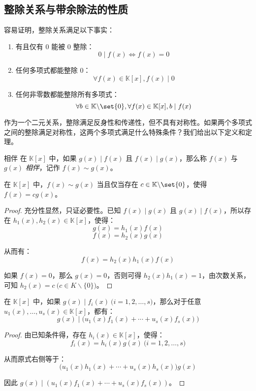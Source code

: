 \subsection{整除关系与带余除法的性质}

容易证明，整除关系满足以下事实：
\begin{enumerate}
	\item 有且仅有 $0$ 能被 $0$ 整除：
	$$
	0 \mid f(x) \Longleftrightarrow f(x) = 0
	$$

	\item 任何多项式都能整除 $0$：
	$$
	\forall f(x) \in \mathbb K[x], f(x) \mid 0
	$$
	\item 任何非零数都能整除所有多项式：
	$$
	\forall b \in \mathbb K \backslash \set{0}, \forall f(x) \in \mathbb K[x], b \mid f(x)
	$$
\end{enumerate}

作为一个二元关系，整除满足反身性和传递性，但不具有对称性。如果两个多项式之间的整除满足对称性，这两个多项式满足什么特殊条件？我们给出以下定义和定理。

\begin{definition}{相伴}
	在 $\mathbb K[x]$ 中，如果 $g(x) \mid f(x)$ 且 $f(x) \mid g(x)$，那么称 $f(x)$ 与 $g(x)$ \emph{相伴}，记作 $f(x) \sim g(x)$。
\end{definition}

\begin{proposition}
	在 $\mathbb K[x]$ 中，$f(x) \sim g(x)$ 当且仅当存在 $c \in \mathbb K \backslash \set{0}$，使得 $f(x) = c g(x)$。
\end{proposition}

\begin{proof}
	充分性显然，只证必要性。已知 $f(x) \mid g(x)$ 且 $g(x) \mid f(x)$，所以存在 $h_1(x), h_2(x) \in \mathbb K[x]$，使得：
	$$
	g(x) = h_1(x) f(x)
	$$$$
	f(x) = h_2(x) g(x)
	$$

	从而有：
	$$
	f(x) = h_2(x) h_1(x) f(x)
	$$

	如果 $f(x) = 0$，那么 $g(x) = 0$，否则可得 $h_2(x) h_1(x) = 1$，由次数关系，可知 $h_2(x) = c \pod{c \in K \backslash \{0\}}$。
\end{proof}

\begin{proposition}
	在 $\mathbb K[x]$ 中，如果 $g(x) \mid f_i(x) \pod{i = 1, 2, \ldots, s}$，那么对于任意 $u_1(x), \ldots, u_s(x) \in \mathbb K[x]$，都有：
	$$
	g(x) \mid \bigl( u_1(x) f_1(x) + \cdots + u_s(x) f_s(x) \bigr)
	$$
\end{proposition}

\begin{proof}
	由已知条件得，存在 $h_i(x) \in \mathbb K[x]$，使得：
	$$
	f_i(x) = h_i(x) g(x) \pod{i = 1, 2, \ldots, s}
	$$

	从而原式右侧等于：
	$$
	\bigl( u_1(x) h_1(x) + \cdots + u_s(x) h_s(x) \bigr) g(x)
	$$

	因此 $g(x) \mid (u_1(x) f_1(x) + \cdots + u_s(x) f_s(x))$。
\end{proof}

